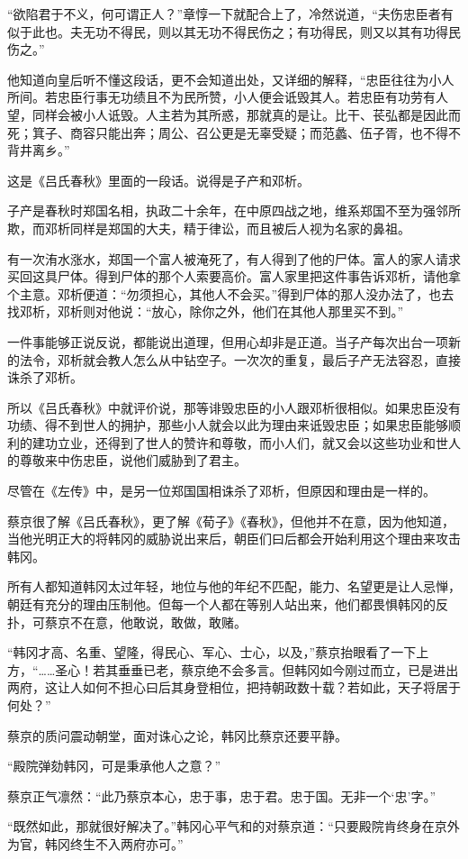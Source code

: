 “欲陷君于不义，何可谓正人？”章惇一下就配合上了，冷然说道，“夫伤忠臣者有似于此也。夫无功不得民，则以其无功不得民伤之；有功得民，则又以其有功得民伤之。”

他知道向皇后听不懂这段话，更不会知道出处，又详细的解释，“忠臣往往为小人所间。若忠臣行事无功绩且不为民所赞，小人便会诋毁其人。若忠臣有功劳有人望，同样会被小人诋毁。人主若为其所惑，那就真的是让。比干、苌弘都是因此而死；箕子、商容只能出奔；周公、召公更是无辜受疑；而范蠡、伍子胥，也不得不背井离乡。”

这是《吕氏春秋》里面的一段话。说得是子产和邓析。

子产是春秋时郑国名相，执政二十余年，在中原四战之地，维系郑国不至为强邻所欺，而邓析同样是郑国的大夫，精于律讼，而且被后人视为名家的鼻祖。

有一次洧水涨水，郑国一个富人被淹死了，有人得到了他的尸体。富人的家人请求买回这具尸体。得到尸体的那个人索要高价。富人家里把这件事告诉邓析，请他拿个主意。邓析便道：“勿须担心，其他人不会买。”得到尸体的那人没办法了，也去找邓析，邓析则对他说：“放心，除你之外，他们在其他人那里买不到。”

一件事能够正说反说，都能说出道理，但用心却非是正道。当子产每次出台一项新的法令，邓析就会教人怎么从中钻空子。一次次的重复，最后子产无法容忍，直接诛杀了邓析。

所以《吕氏春秋》中就评价说，那等诽毁忠臣的小人跟邓析很相似。如果忠臣没有功绩、得不到世人的拥护，那些小人就会以此为理由来诋毁忠臣；如果忠臣能够顺利的建功立业，还得到了世人的赞许和尊敬，而小人们，就又会以这些功业和世人的尊敬来中伤忠臣，说他们威胁到了君主。

尽管在《左传》中，是另一位郑国国相诛杀了邓析，但原因和理由是一样的。

蔡京很了解《吕氏春秋》，更了解《荀子》《春秋》，但他并不在意，因为他知道，当他光明正大的将韩冈的威胁说出来后，朝臣们曰后都会开始利用这个理由来攻击韩冈。

所有人都知道韩冈太过年轻，地位与他的年纪不匹配，能力、名望更是让人忌惮，朝廷有充分的理由压制他。但每一个人都在等别人站出来，他们都畏惧韩冈的反扑，可蔡京不在意，他敢说，敢做，敢赌。

“韩冈才高、名重、望隆，得民心、军心、士心，以及，”蔡京抬眼看了一下上方，“……圣心！若其垂垂已老，蔡京绝不会多言。但韩冈如今刚过而立，已是进出两府，这让人如何不担心曰后其身登相位，把持朝政数十载？若如此，天子将居于何处？”

蔡京的质问震动朝堂，面对诛心之论，韩冈比蔡京还要平静。

“殿院弹劾韩冈，可是秉承他人之意？”

蔡京正气凛然：“此乃蔡京本心，忠于事，忠于君。忠于国。无非一个‘忠’字。”

“既然如此，那就很好解决了。”韩冈心平气和的对蔡京道：“只要殿院肯终身在京外为官，韩冈终生不入两府亦可。”


